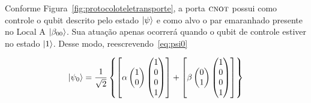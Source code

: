 Conforme Figura~\ref{fig:protocoloteletransporte}, a porta \(\operatorname{\textsc{cnot}}\) possui como controle o qubit descrito pelo estado $\ket{\psi}$ e como alvo o par emaranhado presente no Local A $\ket{\beta_{00}}$. Sua atuação apenas ocorrerá quando o qubit de controle estiver no estado $\ket{1}$. Desse modo, reescrevendo~\eqref{eq:psi0}

\begin{equation}\label{eq:psi0cnot}
\ket{\psi_0} = \frac{1}{\sqrt{2}}\left\{\left[\alpha \begin{pmatrix}
1 \\
0 
\end{pmatrix}  \begin{pmatrix}
1 \\
0 \\
0 \\
1
\end{pmatrix}\right] + \left[\beta \begin{pmatrix}
0 \\
1
\end{pmatrix}  \begin{pmatrix}
1 \\
0 \\
0 \\
1
\end{pmatrix}\right] \right\}
\end{equation}

